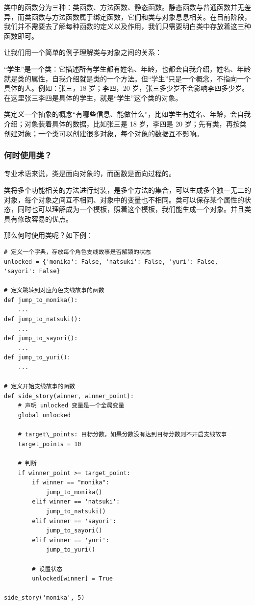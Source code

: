 \documentclass[../../Main.tex]{subfiles}
\begin{document}
类中的函数分为三种：类函数、方法函数、静态函数。静态函数与普通函数并无差异，而类函数与方法函数属于绑定函数，它们和类与对象息息相关。在目前阶段，我们并不需要去了解每种函数的定义以及作用，我们只需要明白类中存放着这三种函数即可。

让我们用一个简单的例子理解类与对象之间的关系：

“学生”是一个类：它描述所有学生都有姓名、年龄，也都会自我介绍，姓名、年龄就是类的属性，自我介绍就是类的一个方法。但“学生”只是一个概念，不指向一个具体的人。例如：张三，18 岁；李四，20 岁，张三多少岁不会影响李四多少岁。在这里张三李四是具体的学生，就是“学生”这个类的对象。

类定义一个抽象的概念“有哪些信息、能做什么”，比如学生有姓名、年龄，会自我介绍；对象装着具体的数据，比如张三是 18 岁，李四是 20 岁；先有类，再按类创建对象；一个类可以创建很多对象，每个对象的数据互不影响。

\subsubsection{何时使用类？}
专业术语来说，类是面向对象的，而函数是面向过程的。

类将多个功能相关的方法进行封装，是多个方法的集合，可以生成多个独一无二的对象，每个对象之间互不相同、对象中的变量也不相同。类可以保存某个属性的状态，同时也可以理解成为一个模板，照着这个模板，我们能生成一个对象。并且类具有修改容易的优点。

那么何时使用类呢？如下例：
\begin{lstlisting}
# 定义一个字典，存放每个角色支线故事是否解锁的状态
unlocked = {'monika': False, 'natsuki': False, 'yuri': False, 'sayori': False}

# 定义跳转到对应角色支线故事的函数
def jump_to_monika():
    ...
def jump_to_natsuki():
    ...
def jump_to_sayori():
    ...
def jump_to_yuri():
    ...

# 定义开始支线故事的函数
def side_story(winner, winner_point):
    # 声明 unlocked 变量是一个全局变量
    global unlocked

    # target\_points: 目标分数，如果分数没有达到目标分数则不开启支线故事
    target_points = 10

    # 判断
    if winner_point >= target_point:
        if winner == "monika":
            jump_to_monika()
        elif winner == 'natsuki':
            jump_to_natsuki()
        elif winner == 'sayori':
            jump_to_sayori()
        elif winner == 'yuri':
            jump_to_yuri()

        # 设置状态
        unlocked[winner] = True

side_story('monika', 5)

\end{lstlisting}
\end{document}
